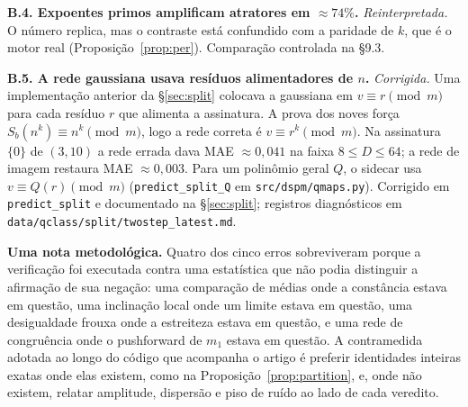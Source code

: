 \documentclass[11pt]{article}
\theoremstyle{definition}
\theoremstyle{remark}
\begin{document}
\medskip
\noindent\textbf{B.4. Expoentes primos amplificam atratores em $\approx 74\%$.} \emph{Reinterpretada.} O número replica, mas o contraste está confundido com a paridade de $k$, que é o motor real (Proposição~\ref{prop:per}). Comparação controlada na \S9.3.

\medskip
\noindent\textbf{B.5. A rede gaussiana usava resíduos alimentadores de $n$.} \emph{Corrigida.} Uma implementação anterior da \S\ref{sec:split} colocava a gaussiana em $v \equiv r \pmod m$ para cada resíduo $r$ que alimenta a assinatura. A prova dos noves força $S_b(n^k) \equiv n^k \pmod m$, logo a rede correta é $v \equiv r^k \pmod m$. Na assinatura $\{0\}$ de $(3,10)$ a rede errada dava MAE $\approx 0{,}041$ na faixa $8 \le D \le 64$; a rede de imagem restaura MAE $\approx 0{,}003$. Para um polinômio geral $Q$, o sidecar usa $v \equiv Q(r) \pmod m$ (\texttt{predict\_split\_Q} em \texttt{src/dspm/qmaps.py}). Corrigido em \texttt{predict\_split} e documentado na \S\ref{sec:split}; registros diagnósticos em \texttt{data/qclass/split/twostep\_latest.md}.

\medskip
\noindent\textbf{Uma nota metodológica.} Quatro dos cinco erros sobreviveram porque a verificação foi executada contra uma estatística que não podia distinguir a afirmação de sua negação: uma comparação de médias onde a constância estava em questão, uma inclinação local onde um limite estava em questão, uma desigualdade frouxa onde a estreiteza estava em questão, e uma rede de congruência onde o pushforward de $m_1$ estava em questão. A contramedida adotada ao longo do código que acompanha o artigo é preferir identidades inteiras exatas onde elas existem, como na Proposição~\ref{prop:partition}, e, onde não existem, relatar amplitude, dispersão e piso de ruído ao lado de cada veredito.
\end{document}
